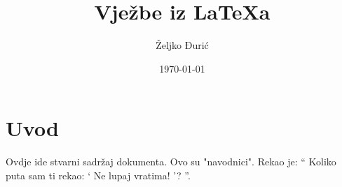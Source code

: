 \documentclass[12pt]{scrartcl}
\begin{document}
    \title{Vježbe iz \LaTeX a}
    \author{Željko Đurić}
    \date{\today}
    \maketitle
    \section{Uvod}
        Ovdje ide stvarni sadržaj dokumenta.
        Ovo su "navodnici".
        Rekao je:
        \enquote {
            Koliko puta sam ti rekao:
                \enquote {
                    Ne lupaj vratima!
                }?
        }.
\end{document}
